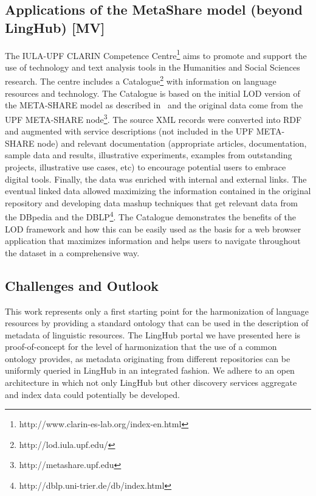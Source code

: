 \documentclass{llncs}
\begin{document}
{\subsection{Applications of the MetaShare model (beyond LingHub) [MV]}
\label{sec:applications}
The IULA-UPF CLARIN Competence Centre\footnote{http://www.clarin-es-lab.org/index-en.html} aims to promote and support the use of technology and text analysis tools in the Humanities and Social Sciences research. The centre includes a Catalogue\footnote{http://lod.iula.upf.edu/} with information on language resources and technology. The Catalogue is based on the initial LOD version of the META-SHARE model as described in~\cite{Villegas2014} and the original data come from the UPF META-SHARE node\footnote{http://metashare.upf.edu}. The source XML records were converted into RDF and augmented with service descriptions (not included in the UPF META-SHARE node) and relevant documentation (appropriate articles, documentation, sample data and results, illustrative experiments, examples from outstanding projects, illustrative use cases, etc) to encourage potential users to embrace digital tools. Finally, the data was enriched with internal and external links. The eventual linked data allowed maximizing the information
contained in the original repository and developing data mashup techniques that get relevant data from the DBpedia and the DBLP\footnote{http://dblp.uni-trier.de/db/index.html}. The Catalogue demonstrates the benefits of the LOD framework and how this can be easily used as the basis for a web browser application that maximizes information and helps users to navigate throughout the dataset in a comprehensive way.

\subsection{Challenges and Outlook}
\label{sec:challenges}

This work represents only a first starting point for the harmonization of language resources by providing a standard ontology that can be used in the description of metadata of linguistic resources. The LingHub portal we have presented here is proof-of-concept for the level of harmonization that the use of a common ontology provides, as metadata originating from different repositories can be uniformly queried in LingHub in an integrated fashion. We adhere to an open architecture in which not only LingHub but other discovery services aggregate and index data could potentially be developed. 

}
\end{document}
